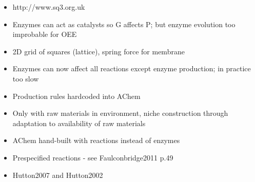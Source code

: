 		\begin{itemize}
			\item
			
			http://www.sq3.org.uk
			
			\item
			
			Enzymes can act as catalysts so G affects P; but enzyme evolution too
			improbable for OEE
			
			\item
			
			2D grid of squares (lattice), spring force for membrane
			
			\item
			
			Enzymes can now affect all reactions except enzyme production; in
			practice too slow
			
			\item
			
			Production rules hardcoded into AChem
			
			\item
			
			Only with raw materials in environment, niche construction through
			adaptation to availability of raw materials
			
			\item
			
			AChem hand-built with reactions instead of enzymes
			
			\item
			
			Prespecified reactions - see Faulconbridge2011 p.49
			
			\item
			
			Hutton2007 and Hutton2002
			
		\end{itemize}
		
